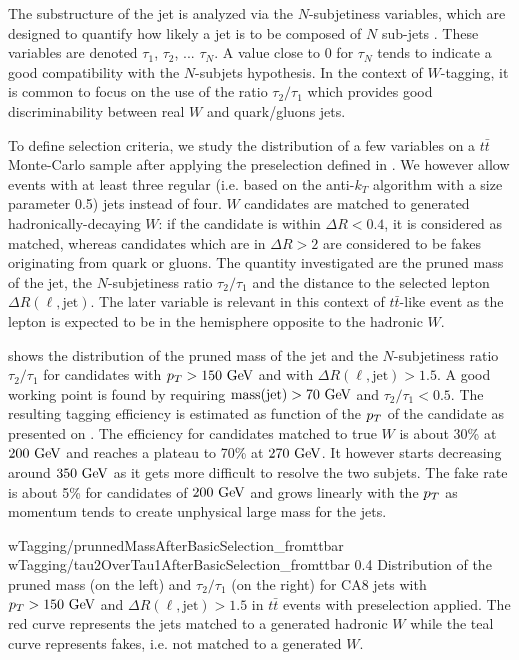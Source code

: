     The substructure of the jet is analyzed via the $N$-subjetiness variables,
    which are designed to quantify how likely a jet is to be composed of $N$
    sub-jets \cite{N-subjettiness}. These variables are denoted $\tau_1$,
    $\tau_2$, ... $\tau_N$. A value close to 0 for $\tau_N$ tends to indicate
    a good compatibility with the $N$-subjets hypothesis. In the context of
    $W$-tagging, it is common to focus on the use of the ratio $\tau_2/\tau_1$
    which provides good discriminability between real $W$ and quark/gluons jets.

    To define selection criteria, we study the distribution of a few variables
    on a $t\bar{t}$ Monte-Carlo sample after applying the preselection defined in
    . We however allow events with at
    least three regular (i.e. based on the anti-$k_T$ algorithm with a size parameter 0.5) jets
    instead of four. $W$ candidates are matched to generated
    hadronically-decaying $W$: if the candidate is within $\Delta R < 0.4$, it
    is considered as matched, whereas candidates which are in $\Delta R > 2$ are
    considered to be fakes originating from quark or gluons.
    The quantity investigated are the pruned mass of the jet, the $N$-subjetiness ratio
    $\tau_2 / \tau_1$ and the distance to the selected lepton $\Delta R (\ell,\text{jet})$.
    The later variable is relevant in this context of $t\bar{t}$-like event as the lepton
    is expected to be in the hemisphere opposite to the hadronic $W$.

     shows the distribution of the pruned mass of
    the jet and the $N$-subjetiness ratio $\tau_2 / \tau_1$ for candidates with
    $p_T > 150~\text{GeV}$ and with $\Delta R(\ell,\text{jet}) > 1.5$. A good working point
    is found by requiring $\text{mass}(\text{jet}) > 70~\text{GeV}$ and $\tau_2 / \tau_1 < 0.5$.
    The resulting tagging efficiency is estimated as function of the $p_T$ of the
    candidate as presented on .
    The efficiency for candidates matched
    to true $W$ is about 30\% at $200~\text{GeV}$ and reaches a plateau to 70\% at $270~\text{GeV}$. It
    however starts decreasing around $350~\text{GeV}$ as it gets more difficult to resolve
    the two subjets. The fake rate is about 5\% for candidates of $200~\text{GeV}$ and
    grows linearly with the $p_T$ as momentum tends to create unphysical large
    mass for the jets.

                     {wTagging/prunnedMassAfterBasicSelection_fromttbar}
                     {wTagging/tau2OverTau1AfterBasicSelection_fromttbar}
                     {0.4}
                     {Distribution of the pruned mass (on the left) and $\tau_2
                     / \tau_1$ (on the right) for CA8 jets with $p_T > 150~\text{GeV}$ and
                     $\Delta R(\ell,\text{jet}) > 1.5$ in $t\bar{t}$ events
                     with preselection applied. The red curve represents the
                     jets matched to a generated hadronic $W$ while the teal
                     curve represents fakes, i.e. not matched to a generated $W$.}

